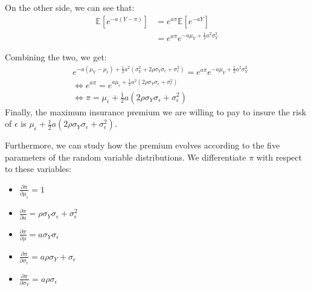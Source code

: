 \documentclass[10pt]{article}
\newcommand{\Ebb}{\mathbb{E}}
\newenvironment{exercise}[2][Exercise]{\begin{trivlist}
  \item[\hskip \labelsep {\bfseries #1}\hskip \labelsep {\bfseries #2.}]}{\end{trivlist}}
\begin{document}
\begin{exercise}{1}
On the other side, we can see that:
\begin{align*}
  \Ebb[e^{-a(Y-\pi)}] &= e^{a\pi}\Ebb[e^{-aY}] \\
  &= e^{a\pi}e^{-a\mu_Y + \frac{1}{2}a^2\sigma_Y^2}
\end{align*}
 
Combining the two, we get:
\begin{align*}
  &e^{-a(\mu_Y-\mu_\epsilon) +\frac{1}{2}a^2(\sigma_Y^2 + 2\rho\sigma_Y\sigma_\epsilon + \sigma_\epsilon^2)} = e^{a\pi}e^{-a\mu_Y + \frac{1}{2}a^2\sigma_Y^2}\\
  &\iff e^{a\pi} = e^{a\mu_\epsilon +\frac{1}{2}a^2(2\rho\sigma_Y\sigma_\epsilon + \sigma_\epsilon^2)}\\
  &\iff \pi = \mu_\epsilon + \frac{1}{2}a(2\rho\sigma_Y\sigma_\epsilon + \sigma_\epsilon^2)
\end{align*}
Finally, the maximum insurance premium we are willing to pay to insure the risk of $\epsilon$ is $\mu_\epsilon + \frac{1}{2}a(2\rho\sigma_Y\sigma_\epsilon + \sigma_\epsilon^2)$.

Furthermore, we can study how the premium evolves according to the five parameters of the random variable distributions. 
We differentiate $\pi$ with respect to these variables:
\begin{itemize}
  \item $\frac{\partial\pi}{\partial\mu_\epsilon} = 1$
  \item $\frac{\partial\pi}{\partial a} = \rho\sigma_Y\sigma_\epsilon + \sigma_\epsilon^2$
  \item $\frac{\partial\pi}{\partial\rho} = a\sigma_Y\sigma_\epsilon$
  \item $\frac{\partial\pi}{\partial\sigma_\epsilon} = a\rho\sigma_Y + \sigma_\epsilon$
  \item $\frac{\partial\pi}{\partial\sigma_Y} = a\rho\sigma_\epsilon$
\end{itemize}

  \end{exercise}
\end{document}
